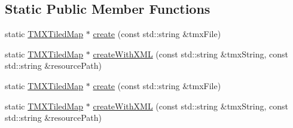 \subsection*{Static Public Member Functions}
\begin{DoxyCompactItemize}
\item 
static \hyperlink{classexperimental_1_1TMXTiledMap}{T\+M\+X\+Tiled\+Map} $\ast$ \hyperlink{classexperimental_1_1TMXTiledMap_a7c5e6764003c96d2de8ee1319ad49005}{create} (const std\+::string \&tmx\+File)
\item 
static \hyperlink{classexperimental_1_1TMXTiledMap}{T\+M\+X\+Tiled\+Map} $\ast$ \hyperlink{classexperimental_1_1TMXTiledMap_af3a5adeaeec14ab3455494f0c230335b}{create\+With\+X\+ML} (const std\+::string \&tmx\+String, const std\+::string \&resource\+Path)
\item 
static \hyperlink{classexperimental_1_1TMXTiledMap}{T\+M\+X\+Tiled\+Map} $\ast$ \hyperlink{classexperimental_1_1TMXTiledMap_a8abca4e303ab8938e093b24cbf750f2d}{create} (const std\+::string \&tmx\+File)
\item 
static \hyperlink{classexperimental_1_1TMXTiledMap}{T\+M\+X\+Tiled\+Map} $\ast$ \hyperlink{classexperimental_1_1TMXTiledMap_a482b4caac448d8300aef2df784cd31e7}{create\+With\+X\+ML} (const std\+::string \&tmx\+String, const std\+::string \&resource\+Path)
\end{DoxyCompactItemize}
